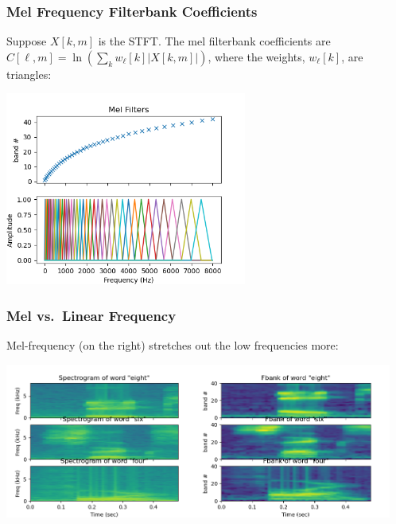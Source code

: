 \documentclass{beamer}
\begin{document}
\begin{frame}
  \frametitle{Mel Frequency Filterbank Coefficients}

  Suppose $X[k,m]$ is the STFT.  The mel filterbank coefficients are
  $C[\ell,m] = \ln\left(\sum_k w_\ell[k] |X[k,m]|\right)$, where the
  weights, $w_\ell[k]$, are triangles:
  \centerline{\includegraphics[height=2.5in]{mel_triangles.png}}
\end{frame}

\begin{frame}
  \frametitle{Mel vs.~Linear Frequency}

  Mel-frequency (on the right) stretches out the low frequencies more:
  
  \centerline{\includegraphics[height=2in]{spectrograms.png}\includegraphics[height=2in]{fbank_spectrograms.png}}
\end{frame}

\end{document}
